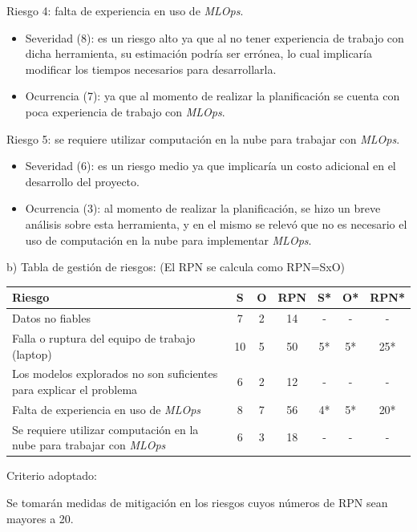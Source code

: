 \documentclass[
11pt, %
]{charter}
\begin{document}
Riesgo 4: falta de experiencia en uso de \textit{MLOps}.
\begin{itemize}
	\item Severidad (8): es un riesgo alto ya que al no tener experiencia de trabajo con dicha herramienta, su estimación podría ser errónea, lo cual implicaría modificar los tiempos necesarios para desarrollarla.
	\item Ocurrencia (7): ya que al momento de realizar la planificación se cuenta con poca experiencia de trabajo con \textit{MLOps}. 
\end{itemize}

Riesgo 5: se requiere utilizar computación en la nube para trabajar con \textit{MLOps}.
\begin{itemize}
	\item Severidad (6): es un riesgo medio ya que implicaría un costo adicional en el desarrollo del proyecto.
	\item Ocurrencia (3): al momento de realizar la planificación, se hizo un breve análisis sobre esta herramienta, y en el mismo se relevó que no es necesario el uso de computación en la nube para implementar \textit{MLOps}. 
\end{itemize}


b) Tabla de gestión de riesgos:      (El RPN se calcula como RPN=SxO)

\begin{table}[htpb]
\centering
\begin{tabularx}{\linewidth}{@{}|X|c|c|c|c|c|c|@{}}
\hline
\rowcolor[HTML]{C0C0C0} 
Riesgo & S & O & RPN & S* & O* & RPN* \\ \hline
Datos no fiables       &  7  &  2  &  14   & - & - & - \\ \hline
Falla o ruptura del equipo de trabajo (laptop) & 10 & 5 &  50   & 5* & 5* & 25* \\ \hline
Los modelos explorados no son suficientes para explicar el problema & 6 & 2 & 12 & - & - & - \\ \hline
Falta de experiencia en uso de \textit{MLOps} & 8 &  7  &  56   &  4*  & 5* & 20* \\ \hline
Se requiere utilizar computación en la nube para trabajar con \textit{MLOps}       & 6 & 3  & 18 & - & - & - \\ \hline
\end{tabularx}%
\end{table}

Criterio adoptado: 

Se tomarán medidas de mitigación en los riesgos cuyos números de RPN sean mayores a 20.
\end{document}
